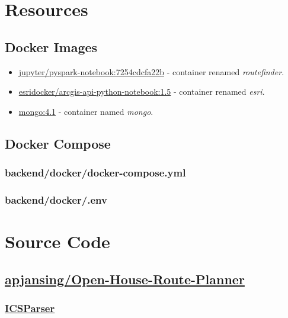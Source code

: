 \chapter{Resources}
\section{Docker Images}\label{docker-images}
\begin{itemize}
  \item \href{https://hub.docker.com/r/jupyter/pyspark-notebook}{jupyter/pyspark-notebook:7254cdcfa22b}\cite{img-pyspark} - container renamed \emph{routefinder}.
  \item \href{https://hub.docker.com/r/esridocker/arcgis-api-python-notebook}{esridocker/arcgis-api-python-notebook:1.5}\cite{img-esri} - container renamed \emph{esri}.
  \item \href{https://hub.docker.com/_/mongo}{mongo:4.1}\cite{img-mongo} - container named \emph{mongo}.
\end{itemize}


\section{Docker Compose}

\subsection{backend/docker/docker-compose.yml}
\subsection{backend/docker/.env}


\chapter{Source Code}\label{code}
\section{\href{https://github.com/apjansing/Open-House-Route-Planner}{apjansing/Open-House-Route-Planner}}

\subsection{\href{https://github.com/apjansing/Open-House-Route-Planner/blob/master/backend/docker/persistence/pyspark/ICSParser.py}{ICSParser}} \label{ICSParser}

